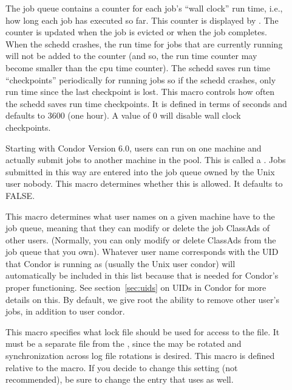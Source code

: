 \begin{description}
\item[] \label{param:WallClockCkptInterval}
  The job queue contains a counter for each job's ``wall clock'' run
  time, i.e., how long each job has executed so far.  This counter is
  displayed by .  The counter is updated when the job is
  evicted or when the job completes.  When the schedd crashes, the run
  time for jobs that are currently running will not be added to the
  counter (and so, the run time counter may become smaller than the
  cpu time counter).  The schedd saves run time ``checkpoints''
  periodically for running jobs so if the schedd crashes, only run
  time since the last checkpoint is lost.  This macro controls how
  often the schedd saves run time checkpoints.  It is defined in terms
  of seconds and defaults to 3600 (one hour).  A value of 0 will
  disable wall clock checkpoints.

\item[] \label{param:AllowRemoteSubmit}
  Starting with Condor Version 6.0, users can run  on
  one machine and actually submit jobs to another machine in the
  pool.  This is called a .  Jobs submitted in
  this way are entered into the job queue owned by the Unix user
  nobody.
  This macro determines whether this is allowed.
  It defaults to FALSE.
     
\item[] \label{param:QueueSuperUsers} This
  macro determines what user names on a given machine have
   to the job queue, meaning that they can
  modify or delete the job ClassAds of other users.  (Normally, you
  can only modify or delete ClassAds from the job queue that you own).
  Whatever user name corresponds with the UID that Condor is running as
  (usually the Unix user condor) will automatically be included in this list
  because that is needed for Condor's proper functioning.  See
  section~\ref{sec:uids} on UIDs in Condor for more details on
  this.  By default, we give root the ability to remove other
  user's jobs, in addition to user condor.
      
\item[] \label{param:ScheddLock} This macro
  specifies what lock file should be used for access to the
   file.  It must be a separate file from the
  , since the  may be rotated and
  synchronization across log file rotations
  is desired.
  This macro is defined relative to the  macro.
  If you decide to change this setting (not recommended),
  be sure to change the  entry that
   uses as well.


\end{description}

